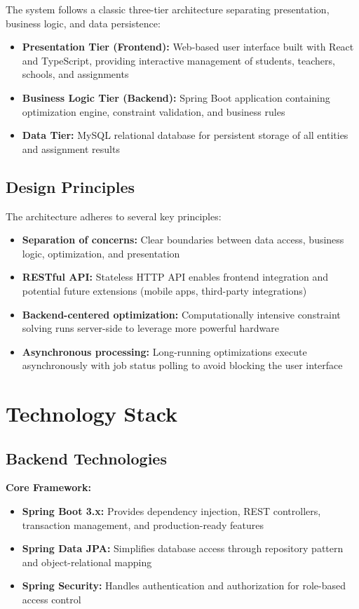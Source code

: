 \documentclass[12pt,a4paper]{report}
\begin{document}
The system follows a classic three-tier architecture separating presentation, business logic, and data persistence:

\begin{itemize}
    \item \textbf{Presentation Tier (Frontend):} Web-based user interface built with React and TypeScript, providing interactive management of students, teachers, schools, and assignments
    \item \textbf{Business Logic Tier (Backend):} Spring Boot application containing optimization engine, constraint validation, and business rules
    \item \textbf{Data Tier:} MySQL relational database for persistent storage of all entities and assignment results
\end{itemize}

\subsection{Design Principles}

The architecture adheres to several key principles:

\begin{itemize}
    \item \textbf{Separation of concerns:} Clear boundaries between data access, business logic, optimization, and presentation
    \item \textbf{RESTful API:} Stateless HTTP API enables frontend integration and potential future extensions (mobile apps, third-party integrations)
    \item \textbf{Backend-centered optimization:} Computationally intensive constraint solving runs server-side to leverage more powerful hardware
    \item \textbf{Asynchronous processing:} Long-running optimizations execute asynchronously with job status polling to avoid blocking the user interface
\end{itemize}

\section{Technology Stack}

\subsection{Backend Technologies}

\textbf{Core Framework:}
\begin{itemize}
    \item \textbf{Spring Boot 3.x:} Provides dependency injection, REST controllers, transaction management, and production-ready features
    \item \textbf{Spring Data JPA:} Simplifies database access through repository pattern and object-relational mapping
    \item \textbf{Spring Security:} Handles authentication and authorization for role-based access control
\end{itemize}
\end{document}

